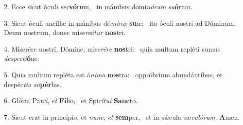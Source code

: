 2. Ecce sicut ócu\textit{li} \textit{ser}\textbf{vó}rum, \ast\  in mánibus domi\textit{nó}\textit{rum} \textit{su}\textbf{ó}rum.\

3. Sicut óculi ancíllæ in mánibus dó\textit{mi}\textit{næ} \textbf{su}æ: \ast\  ita óculi nostri ad Dóminum, Deum nostrum, donec mise\textit{re}\textit{á}\textit{tur} \textbf{nos}tri.\

4. Miserére nostri, Dómine, mise\textit{ré}\textit{re} \textbf{nos}tri: \ast\  quia multum repléti sumus \textit{de}\textit{spec}\textit{ti}\textbf{ó}ne:\

5. Quia multum repléta est á\textit{ni}\textit{ma} \textbf{nos}tra: \ast\  oppróbrium abundántibus, et despéc\textit{ti}\textit{o} \textit{su}\textbf{pér}bis.\

6. Glória Pa\textit{tri}, \textit{et} \textbf{Fí}lio, \ast\  et Spi\textit{rí}\textit{tu}\textit{i} \textbf{Sanc}to.\

7. Sicut erat in princípio, et \textit{nunc}, \textit{et} \textbf{sem}per, \ast\  et in sǽcula sæ\textit{cu}\textit{ló}\textit{rum}. \textbf{A}men.\

